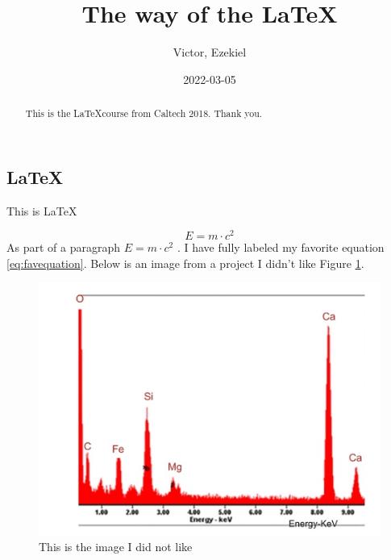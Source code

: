 \documentclass[12pt]{article}
\begin{document}
    \title{The way of the \LaTeX}
    \author{Victor, Ezekiel}
    \date{2022-03-05}

    \maketitle %

    \begin{abstract}
        This is the \LaTeX course from Caltech 2018. Thank you.
    \end{abstract}

    \begin{multicols}{2}   
        \section{\LaTeX}
        This is \LaTeX
    
        \begin{equation}
            \label{eq:favequation}
            E = m \cdot c^2
        \end{equation}
        As part of a paragraph $E = m \cdot c^2$ \citep{article2}. I have fully labeled my favorite equation \ref{eq:favequation}. Below is an image from a project I didn't like Figure \ref{fig:dislike}.
        \begin{center}
            \begin{figure}[H]
                \caption{This is the image I did not like}
                \label{fig:dislike}
                \includegraphics{Picture3.png}
            \end{figure}
        \end{center}
    

    
    
    \end{multicols}
\end{document}
